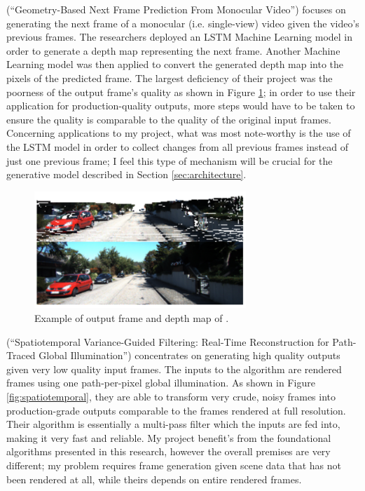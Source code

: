 \documentclass[conference]{IEEEtran}
\begin{document}
\cite{ref:frame_prediction} (``Geometry-Based Next Frame Prediction From
Monocular Video'') focuses on generating the
next frame of a monocular (i.e. single-view) video 
given the video's previous frames. The researchers deployed
an LSTM Machine Learning model in order to generate a depth map representing the next frame.
Another Machine Learning model was then applied to convert the generated depth
map into the pixels of the predicted frame. The largest deficiency of their
project was the poorness of the output frame's quality as shown in Figure
\ref{fig:frame_prediction}; in order to use their
application for production-quality outputs, more steps would have
to be taken to ensure the quality is comparable to the quality of the original input frames.
Concerning applications to my
project, what was most note-worthy is the use of the LSTM model in order to
collect changes from all previous frames instead of just one previous frame;
I feel this type of mechanism will be
crucial for the generative model described in Section \ref{sec:architecture}.

\begin{figure}[htbp]
\centerline{\includegraphics[width=8cm]{frame_prediction.png}}
\caption{Example of output frame and depth map of \cite{ref:frame_prediction}.}
\label{fig:frame_prediction}
\end{figure}

\cite{ref:spatiotemporal} (``Spatiotemporal Variance-Guided Filtering: Real-Time Reconstruction for
Path-Traced Global Illumination'') concentrates on
generating high quality outputs given very low quality input
frames. The inputs to the algorithm are rendered frames using one path-per-pixel global
illumination. As shown in Figure \ref{fig:spatiotemporal}, they are able to
transform very crude, noisy frames into production-grade outputs comparable to
the frames rendered at full resolution. Their algorithm is essentially a
multi-pass filter which the inputs are fed into, making it very fast and
reliable. My project benefit's from the foundational algorithms presented in
this research, however the overall premises are very different; my problem
requires frame generation given scene data that has not been rendered at all,
while theirs depends on entire rendered frames.
\end{document}
